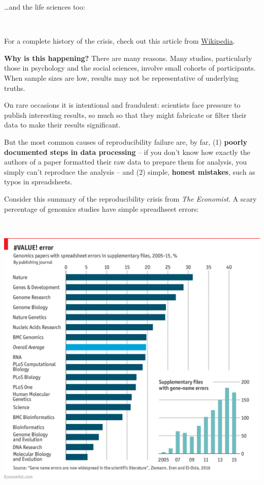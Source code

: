 \documentclass[]{book}
\begin{document}
\ldots{}and the life sciences too:

~

For a complete history of the crisis, check out this article from \href{https://en.wikipedia.org/wiki/Replication_crisis}{Wikipedia}.

\textbf{Why is this happening?} There are many reasons. Many studies, particularly those in psychology and the social sciences, involve small cohorts of participants. When sample sizes are low, results may not be representative of underlying truths.

On rare occasions it is intentional and fraudulent: scientists face pressure to publish interesting results, so much so that they might fabricate or filter their data to make their results significant.

But the most common causes of reproducibility failure are, by far, (1) \textbf{poorly documented steps in data processing} -- if you don't know how exactly the authors of a paper formatted their raw data to prepare them for analysis, you simply can't reproduce the analysis -- and (2) simple, \textbf{honest mistakes}, such as typos in spreadsheets.

Consider this summary of the reproducibility crisis from \emph{The Economist}. A scary percentage of genomics studies have simple spreadhseet errors:

~

\includegraphics{img/reproducibility-economist.png}
~
\end{document}
